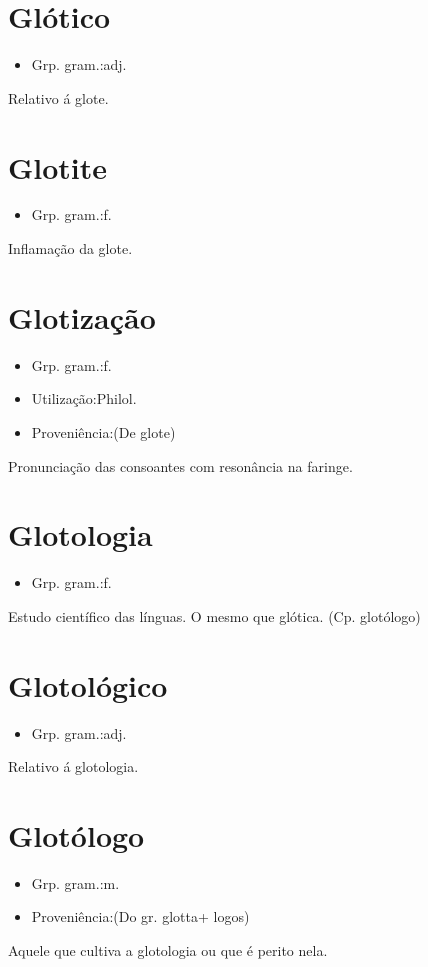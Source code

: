 \section{Glótico}
\begin{itemize}
\item {Grp. gram.:adj.}
\end{itemize}
Relativo á glote.
\section{Glotite}
\begin{itemize}
\item {Grp. gram.:f.}
\end{itemize}
Inflamação da glote.
\section{Glotização}
\begin{itemize}
\item {Grp. gram.:f.}
\end{itemize}
\begin{itemize}
\item {Utilização:Philol.}
\end{itemize}
\begin{itemize}
\item {Proveniência:(De \textunderscore glote\textunderscore )}
\end{itemize}
Pronunciação das consoantes com resonância na faringe.
\section{Glotologia}
\begin{itemize}
\item {Grp. gram.:f.}
\end{itemize}
Estudo científico das línguas.
O mesmo que \textunderscore glótica\textunderscore .
(Cp. \textunderscore glotólogo\textunderscore )
\section{Glotológico}
\begin{itemize}
\item {Grp. gram.:adj.}
\end{itemize}
Relativo á glotologia.
\section{Glotólogo}
\begin{itemize}
\item {Grp. gram.:m.}
\end{itemize}
\begin{itemize}
\item {Proveniência:(Do gr. \textunderscore glotta\textunderscore  + \textunderscore logos\textunderscore )}
\end{itemize}
Aquele que cultiva a glotologia ou que é perito nela.
